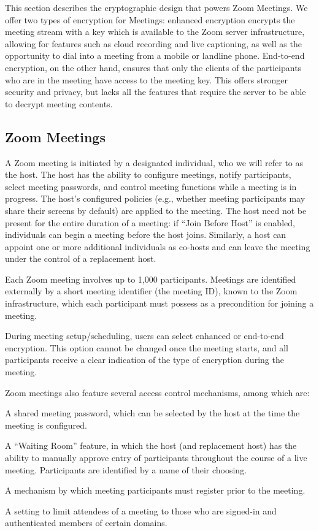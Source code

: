 This section describes the cryptographic design that powers Zoom Meetings. We offer two types of
encryption for Meetings: enhanced encryption encrypts the meeting stream with a key which is
available to the Zoom server infrastructure, allowing for features such as cloud recording and live
captioning, as well as the opportunity to dial into a meeting from a mobile or landline phone.
End-to-end encryption, on the other hand, ensures that only the clients of the participants who are
in the meeting have access to the meeting key. This offers stronger security and privacy, but lacks
all the features that require the server to be able to decrypt meeting contents.

\subsection{Zoom Meetings}
\label{subsec:general-meetings}
A Zoom meeting is initiated by a designated individual, who we will refer to as the host. The host
has the ability to configure meetings, notify participants, select meeting passwords, and control
meeting functions while a meeting is in progress. The host's configured policies (e.g., whether
meeting participants may share their screens by default) are applied to the meeting. The host need
not be present for the entire duration of a meeting: if ``Join Before Host'' is enabled, individuals
can begin a meeting before the host joins. Similarly, a host can appoint one or more additional
individuals as co-hosts and can leave the meeting under the control of a replacement host.

Each Zoom meeting involves up to 1,000 participants. Meetings are identified externally by a short
meeting identifier (the meeting ID), known to the Zoom infrastructure, which each participant must
possess as a precondition for joining a meeting. 

During meeting setup/scheduling, users can select enhanced or end-to-end encryption. This option
cannot be changed once the meeting starts, and all participants receive a clear indication of the
type of encryption during the meeting. 

Zoom meetings also feature several access control mechanisms, among which are:

\begin{itemize*}
\item A shared meeting password, which can be selected by the host at the time the meeting is
configured.
\item A ``Waiting Room'' feature, in which the host (and replacement host) has the ability to
manually approve entry of participants throughout the course of a live meeting. Participants are
identified by a name of their choosing.
\item A mechanism by which meeting participants must register prior to the meeting.
\item A setting to limit attendees of a meeting to those who are signed-in and authenticated members
of certain domains.
\end{itemize*}

